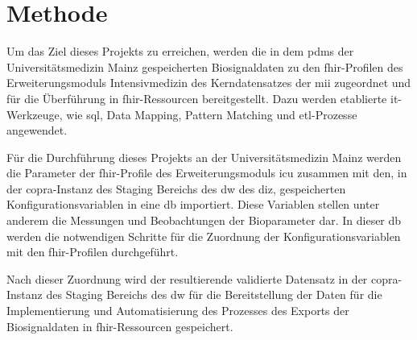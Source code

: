 \chapter{Methode} \label{ch:methods}

Um das Ziel dieses Projekts zu erreichen, werden die in dem \ac{pdms} der Universitätsmedizin Mainz gespeicherten Biosignaldaten zu den \ac{fhir}-Profilen des Erweiterungsmoduls \glqq Intensivmedizin\grqq{} des Kerndatensatzes der \ac{mii} zugeordnet und für die Überführung in \ac{fhir}-Ressourcen bereitgestellt. Dazu werden etablierte \ac{it}-Werkzeuge, wie \ac{sql}, Data Mapping, Pattern Matching und \ac{etl}-Prozesse angewendet.

Für die Durchführung dieses Projekts an der Universitätsmedizin Mainz werden die Parameter der \ac{fhir}-Profile des Erweiterungsmoduls \ac{icu} zusammen mit den, in der \ac{copra}-Instanz des Staging Bereichs des \ac{dw} des \ac{diz}, gespeicherten Konfigurationsvariablen in eine \ac{db} importiert. Diese Variablen stellen unter anderem die Messungen und Beobachtungen der Bioparameter dar. In dieser \ac{db} werden die notwendigen Schritte für die Zuordnung der Konfigurationsvariablen mit den \ac{fhir}-Profilen durchgeführt. 

Nach dieser Zuordnung wird der resultierende validierte Datensatz in der \ac{copra}-Instanz des Staging Bereichs des \ac{dw} für die Bereitstellung der Daten für die Implementierung und Automatisierung des Prozesses des Exports der Biosignaldaten in \ac{fhir}-Ressourcen gespeichert.